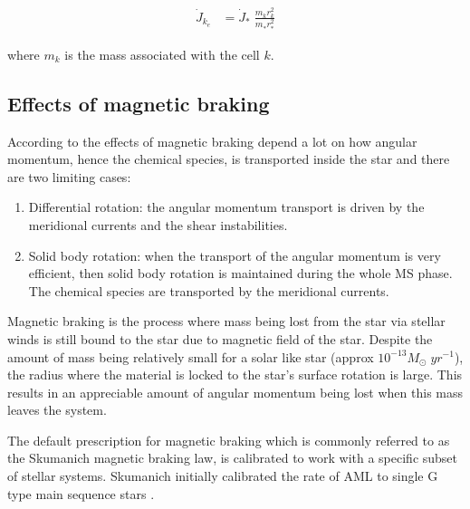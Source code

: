 \documentclass[fleqn,usenatbib]{mnras}
\begin{document}
\begin{ceqn}
\begin{align}
\Dot{J}_{k_e} &= \Dot{J}_*\;\frac{m^{}_{k} r^2_{k}}{m^{}_* r_*^2} \label{eq:k_jdot}
\end{align}
\end{ceqn}
where $m_{k}$ is the mass associated with the cell $k$.\par

\subsection{Effects of magnetic braking}
According to \citet{Meynet2010} the effects of magnetic braking depend a lot on how angular momentum, hence the chemical species, is transported inside the star and there are two limiting cases:
\begin{enumerate}
    \item Differential rotation: the angular momentum transport is driven by the meridional currents and the shear instabilities.
    \item Solid body rotation: when the transport of the angular momentum is very efficient, then solid body rotation is maintained during the whole MS phase. The chemical species are transported by the meridional currents.
\end{enumerate}

Magnetic braking is the process where mass being lost from the star via stellar winds is still bound to the star due to magnetic field of the star. Despite the amount of mass being relatively small for a solar like star (approx $10^{-13}M_{\odot} \; yr^{-1}$), the radius where the material is locked to the star's surface rotation is large. This results in an appreciable amount of angular momentum being lost when this mass leaves the system.\par

The default prescription for magnetic braking which is commonly referred to as the Skumanich magnetic braking law, is calibrated to work with a specific subset of stellar systems. Skumanich initially calibrated the rate of AML to single G type main sequence stars \citep{Skumanich}.\par
\end{document}
